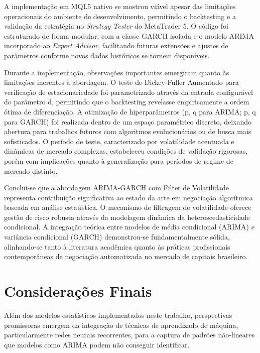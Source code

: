 \par

A implementação em MQL5 nativo se mostrou viável apesar das limitações operacionais do ambiente de desenvolvimento, permitindo o backtesting e a validação da estratégia no \textit{Strategy Tester} do MetaTrader 5. O código foi estruturado de forma modular, com a classe GARCH isolada e o modelo ARIMA incorporado ao \textit{Expert Advisor}, facilitando futuras extensões e ajustes de parâmetros conforme novos dados históricos se tornem disponíveis.

\par

Durante a implementação, observações importantes emergiram quanto às limitações inerentes à abordagem. O teste de Dickey-Fuller Aumentado para verificação de estacionariedade foi parametrizado através da entrada configurável do parâmetro d, permitindo que o backtesting revelasse empiricamente a ordem ótima de diferenciação. A otimização de hiperparâmetros (p, q para ARIMA; p, q para GARCH) foi realizada dentro de um espaço paramétrico discreto, deixando abertura para trabalhos futuros com algoritmos evolucionários ou de busca mais sofisticados. O período de teste, caracterizado por volatilidade acentuada e dinâmicas de mercado complexas, estabeleceu condições de validação rigorosas, porém com implicações quanto à generalização para períodos de regime de mercado distinto.

\par

Conclui-se que a abordagem ARIMA-GARCH com Filter de Volatilidade representa contribuição significativa ao estado da arte em negociação algorítmica baseada em análise estatística. O mecanismo de filtragem de volatilidade oferece gestão de risco robusta através da modelagem dinâmica da heteroscedasticidade condicional. A integração teórica entre modelos de média condicional (ARIMA) e variância condicional (GARCH) demonstrou-se fundamentalmente sólida, alinhando-se tanto à literatura acadêmica quanto às práticas profissionais contemporâneas de negociação automatizada no mercado de capitais brasileiro.

\section{Considerações Finais}

Além dos modelos estatísticos implementados neste trabalho, perspectivas promissoras emergem da integração de técnicas de aprendizado de máquina, particularmente redes neurais recorrentes, para a captura de padrões não-lineares que modelos como ARIMA podem não conseguir identificar.

